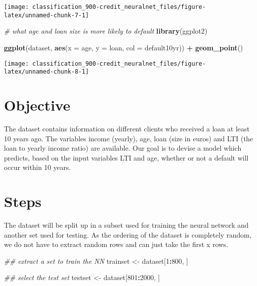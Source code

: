 \documentclass[]{book}
\newenvironment{Shaded}{\begin{snugshade}}{\end{snugshade}}
\newcommand{\CommentTok}[1]{\textcolor[rgb]{0.56,0.35,0.01}{\textit{#1}}}
\newcommand{\DataTypeTok}[1]{\textcolor[rgb]{0.13,0.29,0.53}{#1}}
\newcommand{\DecValTok}[1]{\textcolor[rgb]{0.00,0.00,0.81}{#1}}
\newcommand{\KeywordTok}[1]{\textcolor[rgb]{0.13,0.29,0.53}{\textbf{#1}}}
\newcommand{\NormalTok}[1]{#1}
\newcommand{\OperatorTok}[1]{\textcolor[rgb]{0.81,0.36,0.00}{\textbf{#1}}}
\newcommand{\StringTok}[1]{\textcolor[rgb]{0.31,0.60,0.02}{#1}}
\begin{document}
\begin{center}\texttt{[image: classification\_900-credit\_neuralnet\_files/figure-latex/unnamed-chunk-7-1]} \end{center}

\begin{Shaded}
\begin{Highlighting}[]
\CommentTok{# what age and loan size is more likely to default}
\KeywordTok{library}\NormalTok{(ggplot2)}

\KeywordTok{ggplot}\NormalTok{(dataset, }\KeywordTok{aes}\NormalTok{(}\DataTypeTok{x =}\NormalTok{ age, }\DataTypeTok{y =}\NormalTok{ loan, }\DataTypeTok{col =}\NormalTok{ default10yr)) }\OperatorTok{+}
\StringTok{    }\KeywordTok{geom_point}\NormalTok{()}
\end{Highlighting}
\end{Shaded}

\begin{center}\texttt{[image: classification\_900-credit\_neuralnet\_files/figure-latex/unnamed-chunk-8-1]} \end{center}

\hypertarget{objective}{%
\section{Objective}\label{objective}}

The dataset contains information on different clients who received a loan at least 10 years ago. The variables income (yearly), age, loan (size in euros) and LTI (the loan to yearly income ratio) are available. Our goal is to devise a model which predicts, based on the input variables LTI and age, whether or not a default will occur within 10 years.

\hypertarget{steps}{%
\section{Steps}\label{steps}}

The dataset will be split up in a subset used for training the neural network and another set used for testing. As the ordering of the dataset is completely random, we do not have to extract random rows and can just take the first x rows.

\begin{Shaded}
\begin{Highlighting}[]
\CommentTok{## extract a set to train the NN}
\NormalTok{trainset <-}\StringTok{ }\NormalTok{dataset[}\DecValTok{1}\OperatorTok{:}\DecValTok{800}\NormalTok{, ]}

\CommentTok{## select the test set}
\NormalTok{testset <-}\StringTok{ }\NormalTok{dataset[}\DecValTok{801}\OperatorTok{:}\DecValTok{2000}\NormalTok{, ]}
\end{Highlighting}
\end{Shaded}
\end{document}
